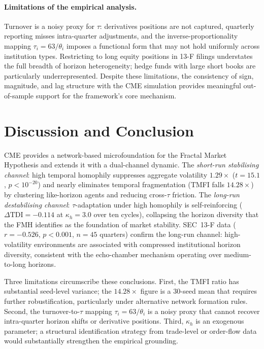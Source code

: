 \documentclass[preprint,12pt,authoryear]{elsarticle}
\begin{document}
\paragraph{Limitations of the empirical analysis.}
Turnover is a noisy proxy for $\tau$: derivatives positions are not
captured, quarterly reporting misses intra-quarter adjustments, and the
inverse-proportionality mapping $\tau_i = 63/\theta_i$ imposes a
functional form that may not hold uniformly across institution types.
Restricting to long equity positions in 13-F filings understates the full
breadth of horizon heterogeneity; hedge funds with large short books are
particularly underrepresented.
Despite these limitations, the consistency of sign, magnitude, and lag
structure with the CME simulation provides meaningful out-of-sample
support for the framework's core mechanism.

\section{Discussion and Conclusion}
\label{sec:conclusion}

CME provides a network-based microfoundation for the Fractal Market
Hypothesis \citep{peters1994} and extends it with a dual-channel dynamic.
The \emph{short-run stabilising channel}: high temporal homophily suppresses
aggregate volatility $1.29\times$ ($t = 15.1$, $p < 10^{-20}$) and nearly
eliminates temporal fragmentation (TMFI falls $14.28\times$) by clustering
like-horizon agents and reducing cross-$\tau$ friction.
The \emph{long-run destabilising channel}: $\tau$-adaptation under high
homophily is self-reinforcing ($\Delta\mathrm{TDI} = -0.114$ at
$\kappa_h = 3.0$ over ten cycles), collapsing the horizon diversity that
the FMH identifies as the foundation of market stability.
SEC~13-F data ($r = -0.526$, $p < 0.001$, $n = 45$ quarters) confirm the
long-run channel: high-volatility environments are associated with
compressed institutional horizon diversity, consistent with the echo-chamber
mechanism operating over medium-to-long horizons.

Three limitations circumscribe these conclusions.
First, the TMFI ratio has substantial seed-level variance; the $14.28\times$
figure is a 30-seed mean that requires further robustification, particularly
under alternative network formation rules.
Second, the turnover-to-$\tau$ mapping $\tau_i = 63/\theta_i$ is a noisy
proxy that cannot recover intra-quarter horizon shifts or derivative positions.
Third, $\kappa_h$ is an exogenous parameter; a structural identification
strategy from trade-level or order-flow data would substantially strengthen
the empirical grounding.
\end{document}

